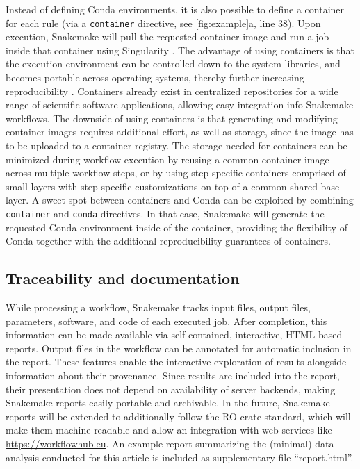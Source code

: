 \documentclass[10pt,a4paper,twocolumn]{article}
\let\plainurl\url
\renewcommand{\url}[1]{\protect\plainurl{#1}}
\begin{document}
Instead of defining Conda environments, it is also possible to define a container for each rule (via a \lstinline!container! directive, see \autoref{fig:example}a, line 38).
Upon execution, Snakemake will pull the requested container image and run a job inside that container using Singularity \parencite{kurtzer_singularity_2017}.
The advantage of using containers is that the execution environment can be controlled down to the system libraries, and becomes portable across operating systems, thereby further increasing reproducibility \parencite{gruning_practical_2018}.
Containers already exist in centralized repositories for a wide range of scientific software applications, allowing easy integration info Snakemake workflows. 
The downside of using containers is that generating and modifying container images requires additional effort, as well as storage, since the image has to be uploaded to a container registry. 
The storage needed for containers can be minimized during workflow execution by reusing a common container image across multiple workflow steps, or by using step-specific containers comprised of small layers with step-specific customizations on top of a common shared base layer. 
A sweet spot between containers and Conda can be exploited by combining \lstinline!container! and \lstinline!conda! directives.
In that case, Snakemake will generate the requested Conda environment inside of the container, providing the flexibility of Conda together with the additional reproducibility guarantees of containers.

\subsection{Traceability and documentation}

While processing a workflow, Snakemake tracks input files, output files, parameters, software, and code of each executed job.
After completion, this information can be made available via self-contained, interactive, HTML based reports.
Output files in the workflow can be annotated for automatic inclusion in the report.
These features enable the interactive exploration of results alongside information about their provenance.
Since results are included into the report, their presentation does not depend on availability of server backends, making Snakemake reports easily portable and archivable.
In the future, Snakemake reports will be extended to additionally follow the RO-crate standard, which will make them machine-readable and allow an integration with web services like \url{https://workflowhub.eu}.
An example report summarizing the (minimal) data analysis conducted for this article is included as supplementary file ``report.html''.
\end{document}
